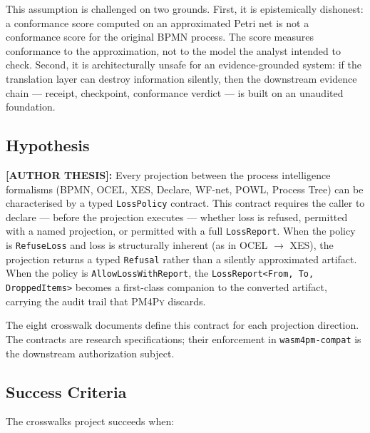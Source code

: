 This assumption is challenged on two grounds. First, it is epistemically dishonest: a conformance
score computed on an approximated Petri net is not a conformance score for the original \textsc{BPMN}
process. The score measures conformance to the approximation, not to the model the analyst intended
to check. Second, it is architecturally unsafe for an evidence-grounded system: if the translation
layer can destroy information silently, then the downstream evidence chain --- receipt, checkpoint,
conformance verdict --- is built on an unaudited foundation.

\subsection{Hypothesis}
\label{sec:crosswalks-rq-hypothesis}

\textbf{[AUTHOR THESIS]:} Every projection between the process intelligence formalisms
(\textsc{BPMN}, \textsc{OCEL}, \textsc{XES}, Declare, WF-net, \textsc{POWL}, Process Tree) can
be characterised by a typed \texttt{LossPolicy} contract. This contract requires the caller to
declare --- before the projection executes --- whether loss is refused, permitted with a named
projection, or permitted with a full \texttt{LossReport}. When the policy is \texttt{RefuseLoss}
and loss is structurally inherent (as in \textsc{OCEL} $\to$ \textsc{XES}), the projection
returns a typed \texttt{Refusal} rather than a silently approximated artifact. When the policy
is \texttt{AllowLossWithReport}, the \texttt{LossReport<From, To, DroppedItems>} becomes a
first-class companion to the converted artifact, carrying the audit trail that \textsc{PM4Py}
discards.

The eight crosswalk documents define this contract for each projection direction. The contracts
are research specifications; their enforcement in \texttt{wasm4pm-compat} is the downstream
authorization subject.

\subsection{Success Criteria}
\label{sec:crosswalks-rq-success}

The crosswalks project succeeds when:

